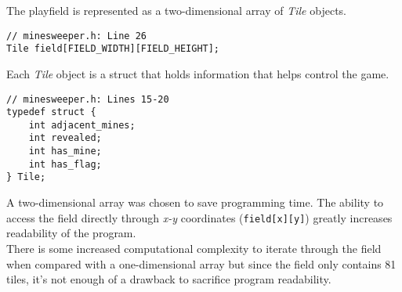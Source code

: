 The playfield is represented as a two-dimensional array of \textit{Tile} objects. 
\begin{lstlisting}[style=CStyle]
// minesweeper.h: Line 26
Tile field[FIELD_WIDTH][FIELD_HEIGHT];
\end{lstlisting}
Each \textit{Tile} object is a struct that holds information that helps control the game.
\begin{lstlisting}[style=CStyle]
// minesweeper.h: Lines 15-20
typedef struct {
	int adjacent_mines;
	int revealed;
	int has_mine;
	int has_flag;
} Tile;
\end{lstlisting}
A two-dimensional array was chosen to save programming time. The ability to access the field directly through \textit{x-y} coordinates (\lstinline{field[x][y]}) greatly increases readability of the program. 
\\
There is some increased computational complexity to iterate through the field when compared with a one-dimensional array but since the field only contains 81 tiles, it's not enough of a drawback to sacrifice program readability. 